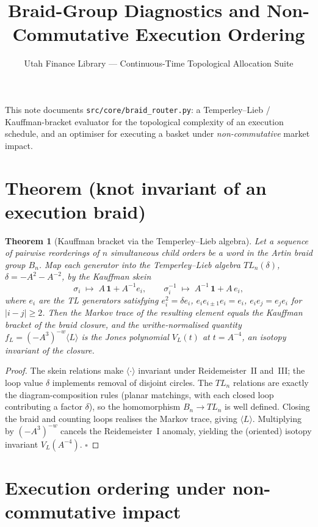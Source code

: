 \documentclass[11pt]{article}
\title{Braid-Group Diagnostics and Non-Commutative Execution Ordering}
\author{Utah Finance Library --- Continuous-Time Topological Allocation Suite}
\date{}
\newtheorem{theorem}{Theorem}
\begin{document}
\maketitle

\noindent
This note documents \texttt{src/core/braid\_router.py}: a Temperley--Lieb /
Kauffman-bracket evaluator for the topological complexity of an execution
schedule, and an optimiser for executing a basket under \emph{non-commutative}
market impact.

\section*{Theorem (knot invariant of an execution braid)}

\begin{theorem}[Kauffman bracket via the Temperley--Lieb algebra]
Let a sequence of pairwise reorderings of $n$ simultaneous child orders be a word
in the Artin braid group $B_n$. Map each generator into the Temperley--Lieb
algebra $TL_n(\delta)$, $\delta = -A^2 - A^{-2}$, by the Kauffman skein
\begin{equation}
\sigma_i \;\mapsto\; A\,\mathbf{1} + A^{-1} e_i,
\qquad
\sigma_i^{-1} \;\mapsto\; A^{-1}\,\mathbf{1} + A\,e_i,
\end{equation}
where $e_i$ are the TL generators satisfying $e_i^2 = \delta e_i$,
$e_i e_{i\pm1} e_i = e_i$, $e_i e_j = e_j e_i$ for $|i-j|\ge 2$. Then the Markov
trace of the resulting element equals the Kauffman bracket of the braid closure,
and the writhe-normalised quantity $f_L = (-A^3)^{-w}\langle L\rangle$ is the
Jones polynomial $V_L(t)$ at $t = A^{-4}$, an isotopy invariant of the closure.
\end{theorem}

\begin{proof}
The skein relations make $\langle\cdot\rangle$ invariant under Reidemeister~II
and~III; the loop value $\delta$ implements removal of disjoint circles. The
$TL_n$ relations are exactly the diagram-composition rules (planar matchings,
with each closed loop contributing a factor $\delta$), so the homomorphism
$B_n \to TL_n$ is well defined. Closing the braid and counting loops realises the
Markov trace, giving $\langle L\rangle$. Multiplying by $(-A^3)^{-w}$ cancels the
Reidemeister~I anomaly, yielding the (oriented) isotopy invariant $V_L(A^{-4})$.
$\square$
\end{proof}

\section*{Execution ordering under non-commutative impact}
\end{document}
